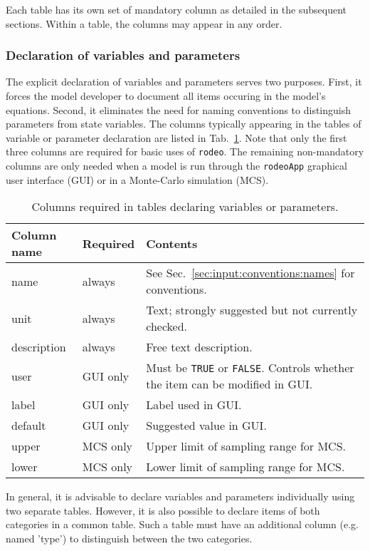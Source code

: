 \documentclass[a4paper]{article}
\newcommand{\rodeo}{\texttt{rodeo}}
\newcommand{\rodeoApp}{\texttt{rodeoApp}}
\begin{document}
Each table has its own set of mandatory column as detailed in the subsequent sections. Within a table, the columns may appear in any order.

\subsubsection{Declaration of variables and parameters} \label{sec:input:tables:vars-pars}

The explicit declaration of variables and parameters serves two purposes. First, it forces the model developer to document all items occuring in the model's equations. Second, it eliminates the need for naming conventions to distinguish parameters from state variables. The columns typically appearing in the tables of variable or parameter declaration are listed in Tab.~\ref{tab:vars-pars}. Note that only the first three columns are required for basic uses of \rodeo. The remaining non-mandatory columns are only needed when a model is run through the \rodeoApp{} graphical user interface (GUI) or in a Monte-Carlo simulation (MCS).

\begin{table}[h!]
  \caption{Columns required in tables declaring variables or parameters. \label{tab:vars-pars}}
  \begin{tabular}{llp{}} \hline\hline
    \textbf{Column name} & \textbf{Required} & \textbf{Contents} \\ \hline
    name & always & See Sec.~\ref{sec:input:conventions:names} for conventions. \\
    unit & always & Text; strongly suggested but not currently checked. \\
    description & always & Free text description. \\
    user & GUI only & Must be \texttt{TRUE} or \texttt{FALSE}. Controls whether the item can be modified in GUI. \\
    label & GUI only & Label used in GUI. \\
    default & GUI only & Suggested value in GUI. \\
    upper & MCS only & Upper limit of sampling range for MCS. \\
    lower & MCS only & Lower limit of sampling range for MCS. \\
    \hline
  \end{tabular}
\end{table}

In general, it is advisable to declare variables and parameters individually using two separate tables. However, it is also possible to declare items of both categories in a common table. Such a table must have an additional column (e.g. named 'type') to distinguish between the two categories.
\end{document}

